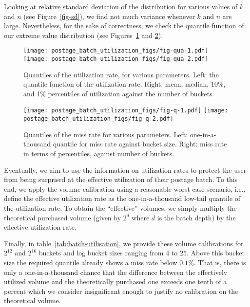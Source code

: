 Looking at relative standard deviation of the distribution for various values of $k$ and $n$ (see Figure~\ref{fig-sd}), we find not much variance whenever $k$ and $n$ are large. Nevertheless, for the sake of correctness, we check the quantile function of our extreme value distribution (see Figures~\ref{fig-qua} and \ref{fig-q}).

\begin{figure}[!ht]
  \centering
  \texttt{[image: postage\_batch\_utilization\_figs/fig-qua-1.pdf]} \texttt{[image: postage\_batch\_utilization\_figs/fig-qua-2.pdf]}
  \caption[Quantiles of the utilization rate]{\label{fig-qua}Quantiles of the utilization rate, for
various parameters. Left: the quantile function of the utilization
rate. Right: mean, median, 10\%, and 1\% percentiles of utilization against the number of buckets.}
\end{figure}

\begin{figure}[!ht]
  \centering
  \texttt{[image: postage\_batch\_utilization\_figs/fig-q-1.pdf]} \texttt{[image: postage\_batch\_utilization\_figs/fig-q-2.pdf]}
  \caption[Quantiles of the miss rate]{Quantiles of the miss rate for various parameters. Left: one-in-a-thousand quantile for miss rate against bucket size. Right: miss rate in terms of percentiles, against number of buckets.}
\label{fig-q}
\end{figure}


Eventually, we aim to use the information on utilization rates to
protect the user from being surprised at the effective utilization of
their postage batch. To this end, we apply the volume calibration using
a reasonable worst-case scenario, i.e., define the effective utilization
rate as the one-in-a-thousand low-tail quantile of the utilization rate.
To obtain the ``effective'' volumes, we simply multiply the theoretical
purchased volume (given by $2^d$ where $d$ is the batch depth) by
the effective utilization rate.


Finally, in table~\ref{tab:batch-utilisation}, we provide these volume calibrations for $2^{12}$ and
$2^{16}$ buckets and log bucket sizes ranging from $4$ to $25$.
Above this bucket size the required quantile already shows a miss rate
below $0.1\%$. That is, there is only a one-in-a-thousand chance that
the difference between the effectively utilized volume and the
theoretically purchased one exceeds one tenth of a percent which we
consider insignificant enough to justify no calibration on the
theoretical volume.

